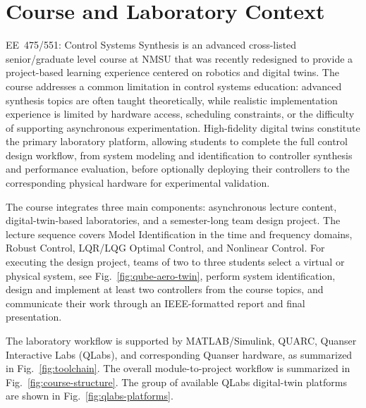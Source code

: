 \documentclass[journal]{IEEEtran}
\begin{document}
\section{Course and Laboratory Context}
\label{sec:course-context}

EE~475/551: Control Systems Synthesis is an advanced cross-listed senior/graduate level course at NMSU that was recently redesigned to provide a project-based learning experience centered on robotics and digital twins. The course addresses a common limitation in control systems education: advanced synthesis topics are often taught theoretically, while realistic implementation experience is limited by hardware access, scheduling constraints, or the difficulty of supporting asynchronous experimentation. High-fidelity digital twins constitute the primary laboratory platform, allowing students to complete the full control design workflow, from system modeling and identification to controller synthesis and performance evaluation, before optionally deploying their controllers to the corresponding physical hardware for experimental validation.


The course integrates three main components: asynchronous lecture content, digital-twin-based laboratories, and a semester-long team design project. The lecture sequence covers Model Identification in the time and frequency domains, Robust Control, LQR/LQG Optimal Control, and Nonlinear Control. For executing the design project, teams of two to three students select a virtual or physical system, see Fig.~\ref{fig:qube-aero-twin}, perform system identification, design and implement at least two controllers from the course topics, and communicate their work through an IEEE-formatted report and final presentation.

The laboratory workflow is supported by MATLAB/Simulink, QUARC, Quanser Interactive Labs (QLabs), and corresponding Quanser hardware, as summarized in Fig.~\ref{fig:toolchain}. The overall module-to-project workflow is summarized in Fig.~\ref{fig:course-structure}.
The group of available QLabs digital-twin platforms are shown in Fig.~\ref{fig:qlabs-platforms}. 
\end{document}
